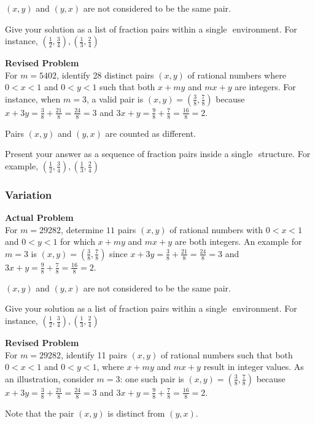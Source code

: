 $(x,y)$ and $(y,x)$ are not considered to be the same pair.

Give your solution as a list of fraction pairs within a single $\boxed{}$ environment. For instance, $\boxed{(\frac{1}{2},\frac{3}{4}),(\frac{1}{3},\frac{2}{4})}$

\textbf{Revised Problem}\\
For \( m = 5402 \), identify 28 distinct pairs \((x, y)\) of rational numbers where \( 0 < x < 1 \) and \( 0 < y < 1 \) such that both \( x + my \) and \( mx + y \) are integers. For instance, when \( m = 3 \), a valid pair is \((x, y) = \left(\frac{3}{8}, \frac{7}{8}\right)\) because \( x + 3y = \frac{3}{8} + \frac{21}{8} = \frac{24}{8} = 3 \) and \( 3x + y = \frac{9}{8} + \frac{7}{8} = \frac{16}{8} = 2 \).

Pairs \((x, y)\) and \((y, x)\) are counted as different.

Present your answer as a sequence of fraction pairs inside a single \(\boxed{}\) structure. For example, \(\boxed{(\frac{1}{2},\frac{3}{4}),(\frac{1}{3},\frac{2}{4})}\)

\subsubsection{Variation}
\textbf{Actual Problem}\\
For $m = 29282$, determine $11$ pairs $(x,y)$ of rational numbers with $0 < x < 1$ and $0 < y < 1$ for which $x+my$ and $mx+y$ are both integers. An example for $m = 3$ is $(x, y) = \left(\frac{3}{8},\frac{7}{8}\right)$ since $x+3y=\frac{3}{8} + \frac{21}{8} = \frac{24}{8} = 3$ and $3x+y=\frac{9}{8} + \frac{7}{8} = \frac{16}{8} = 2$.

$(x,y)$ and $(y,x)$ are not considered to be the same pair.

Give your solution as a list of fraction pairs within a single $\boxed{}$ environment. For instance, $\boxed{(\frac{1}{2},\frac{3}{4}),(\frac{1}{3},\frac{2}{4})}$

\textbf{Revised Problem}\\
For \( m = 29282 \), identify 11 pairs \((x, y)\) of rational numbers such that both \(0 < x < 1\) and \(0 < y < 1\), where \(x + my\) and \(mx + y\) result in integer values. As an illustration, consider \( m = 3 \): one such pair is \((x, y) = \left(\frac{3}{8}, \frac{7}{8}\right)\) because \(x + 3y = \frac{3}{8} + \frac{21}{8} = \frac{24}{8} = 3\) and \(3x + y = \frac{9}{8} + \frac{7}{8} = \frac{16}{8} = 2\).

Note that the pair \((x, y)\) is distinct from \((y, x)\).

